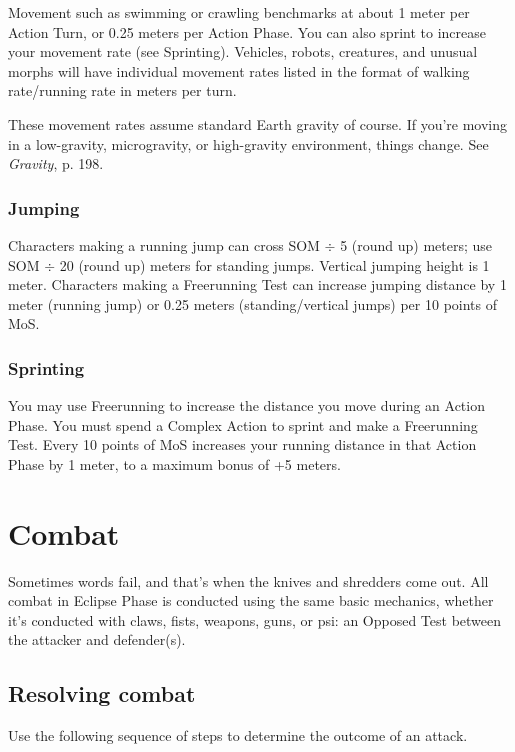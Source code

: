 Movement such as swimming or crawling benchmarks at about 1 meter per Action Turn, or 0.25 meters per Action Phase. You can also sprint to increase your movement rate (see Sprinting). Vehicles, robots, creatures, and unusual morphs will have individual movement rates listed in the format of walking rate/running rate in meters per turn.

These movement rates assume standard Earth gravity of course. If you’re moving in a low-gravity, microgravity, or high-gravity environment, things change. See \emph{Gravity}, p. 198.


\subsubsection{Jumping}

Characters making a running jump can cross SOM $\div$ 5 (round up) meters; use SOM $\div$ 20 (round up) meters for standing jumps. Vertical jumping height is 1 meter. Characters making a Freerunning Test can increase jumping distance by 1 meter (running jump) or 0.25 meters (standing/vertical jumps) per 10 points of MoS.

\subsubsection{Sprinting}

You may use Freerunning to increase the distance you move during an Action Phase. You must spend a Complex Action to sprint and make a Freerunning Test. Every 10 points of MoS increases your running distance in that Action Phase by 1 meter, to a maximum bonus of +5 meters.


\section{Combat}
\label{sec:combat}

Sometimes words fail, and that’s when the knives and shredders come out. All combat in Eclipse Phase is conducted using the same basic mechanics, whether it’s conducted with claws, fists, weapons, guns, or psi: an Opposed Test between the attacker and defender(s).

\subsection{Resolving combat}

Use the following sequence of steps to determine the outcome of an attack.

